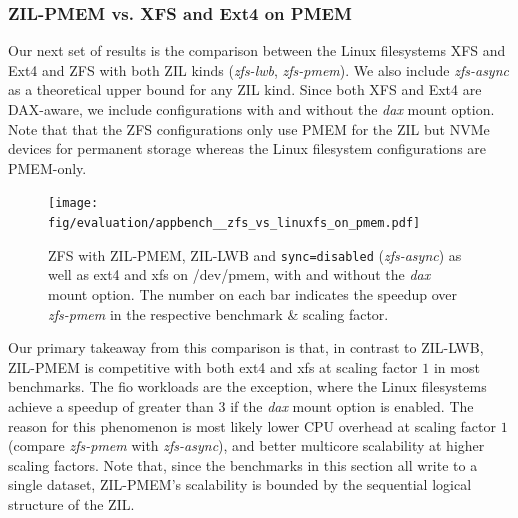 \documentclass[12pt,a4paper,twoside]{book}
\begin{document}
{\subsubsection{ZIL-PMEM vs. XFS and Ext4 on PMEM}

Our next set of results is the comparison between the Linux filesystems XFS and Ext4 and ZFS with both ZIL kinds (\textit{zfs-lwb}, \textit{zfs-pmem}).
We also include \textit{zfs-async} as a theoretical upper bound for any ZIL kind.
Since both XFS and Ext4 are DAX-aware, we include configurations with and without the \textit{dax} mount option.
Note that that the ZFS configurations only use PMEM for the ZIL but NVMe devices for permanent storage whereas the Linux filesystem configurations are PMEM-only.

\begin{figure}[H]
    \centering
    \texttt{[image: fig/evaluation/appbench\_\_zfs\_vs\_linuxfs\_on\_pmem.pdf]}
    \caption{
        ZFS with ZIL-PMEM, ZIL-LWB and \lstinline{sync=disabled} (\textit{zfs-async}) as well as ext4 and xfs on /dev/pmem, with and without the \textit{dax} mount option.
        The number on each bar indicates the speedup over \textit{zfs-pmem} in the respective benchmark \& scaling factor.
    }
\end{figure}

Our primary takeaway from this comparison is that, in contrast to ZIL-LWB, ZIL-PMEM is competitive with both ext4 and xfs at scaling factor $1$ in most benchmarks.
The fio workloads are the exception, where the Linux filesystems achieve a speedup of greater than 3 if the \textit{dax} mount option is enabled.
The reason for this phenomenon is most likely lower CPU overhead at scaling factor $1$ (compare \textit{zfs-pmem} with \textit{zfs-async}), and better multicore scalability at higher scaling factors.
Note that, since the benchmarks in this section all write to a single dataset, ZIL-PMEM's scalability is bounded by the sequential logical structure of the ZIL.

}
\end{document}
